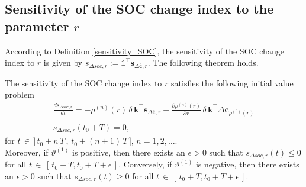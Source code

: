 \subsection{Sensitivity of the SOC change index to the parameter $r$ }\label{subsection:sensitivity to r}
According to Definition \ref{sensitivity_SOC}, the sensitivity of the SOC change index  to $r$
is given by $s_{\Delta soc,r}:=  \mathds{1}^\intercal \mathbf{s}_{\Delta \mathbf{\overline c},r}$. The following theorem holds.

\begin{theorem}\label{thm: sensitivity to r}
 The sensitivity of the SOC change index  to   $r$ satisfies the following initial value problem
 \begin{equation}\label{eq:ode delta SOC sensitivity to r}
\begin{array}{l}\displaystyle \frac{d s_{\Delta soc,r}}{dt}  = -\rho^{(n)}(r) \,\delta\, \mathbf{k}^\intercal \mathbf{s}_{\Delta \mathbf{\overline c},r}-
% 
\displaystyle \frac{\partial\rho^{(n)}(r)}{\partial r} \,\delta\, \mathbf{k}^\intercal \Delta \mathbf{\overline c}_{\rho^{(0)}(r)}\\\\
 s_{\Delta soc,r}(t_0+T)=0,
\end{array}
\end{equation}
for $t\,\in\,]\,t_0+n\,T \,,\,t_0+(n+1)\,T\,],\, n=1,2,\dots$. \\
Moreover, if $\vartheta^{(1)}$ is positive, then there exists an $\epsilon>0$ such that $s_{\Delta soc,r}(t)\leq 0$ for all $t\,\in \,[ \,t_0+T,t_0+T+\epsilon\,]$. Conversely, if $\vartheta^{(1)}$ is negative, then there exists an $\epsilon>0$ such that $s_{\Delta soc,r}(t)\geq 0$ for all $t\,\in \,[ \,t_0+T,t_0+T+\epsilon\,].$ 
 \end{theorem}
